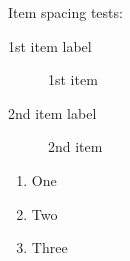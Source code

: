 \documentclass{report}
\begin{document}
Item spacing tests:

\begin{description}
\item[1st item label] 1st item
\item[2nd item label] 2nd item
\end{description}

\begin{enumerate}
\setcounter{enumi}{0} \setcounter{enumii}{0} \setcounter{enumiii}{0} \setcounter{enumiv}{0} 
\item One
\setcounter{enumi}{1} \setcounter{enumii}{1} \setcounter{enumiii}{1} \setcounter{enumiv}{1} 
\item Two
\setcounter{enumi}{2} \setcounter{enumii}{2} \setcounter{enumiii}{2} \setcounter{enumiv}{2} 
\item Three
\end{enumerate}
\end{document}
